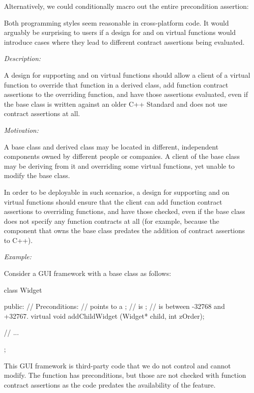 Alternatively, we could conditionally macro out the entire precondition assertion:

\begin{codeblock}
Class Configurator {
public:
  virtual void openConfigFile(const std::string& path)
#ifdef _WIN32
    pre(path.size() < MAX_PATH)
#endif
  {
    // ...
};
\end{codeblock}

Both programming styles seem reasonable in cross-platform code. It would arguably be surprising to users if a design for  and  on virtual functions would introduce cases where they lead to different contract assertions being evaluated.


\emph{Description:}

A design for supporting  and  on virtual functions should allow a client of a virtual function to override that function in a derived class, add function contract assertions to the overriding function, and have those assertions evaluated, even if the base class is written against an older C++ Standard and does not use contract assertions at all.

\emph{Motivation:}

A base class and derived class may be located in different, independent components owned by different people or companies. A client of the base class may be deriving from it and overriding some virtual functions, yet unable to modify the base class.

In order to be deployable in such scenarios, a design for supporting  and  on virtual functions should ensure that the client can add function contract assertions to overriding functions, and have those checked, even if the base class does not specify any function contracts at all (for example, because the component that owns the base class predates the addition of contract assertions to C++).


\emph{Example:}

Consider a GUI framework with a  base class as follows:

\begin{codeblock}
class Widget {
public:
  // Preconditions:   
  // \phantom{xxx} points to a ;
  // \phantom{xxx} is ; 
  // \phantom{xxx} is between -32768 and +32767.
  virtual void addChildWidget (Widget* child, int zOrder);
  
// ...
};
\end{codeblock}
This GUI framework is third-party code that we do not control and cannot modify. The function \allowbreak{} has preconditions, but those are not checked with function contract assertions as the code predates the availability of the feature.

